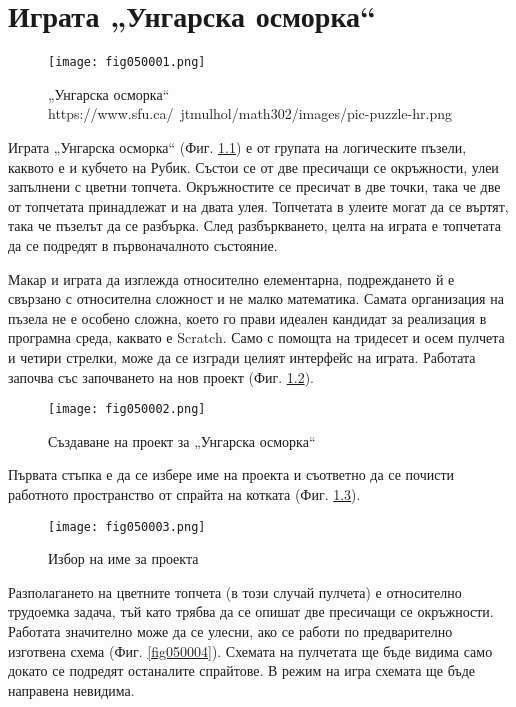 ﻿\chapter{Играта „Унгарска осморка“}

\begin{figure}[H]
  \centering
  \texttt{[image: fig050001.png]}
  \caption{„Унгарска осморка“ \\ https://www.sfu.ca/~jtmulhol/math302/images/pic-puzzle-hr.png}
\label{fig050001}
\end{figure}

Играта „Унгарска осморка“ (Фиг. \ref{fig050001}) е от групата на логическите пъзели, каквото е и кубчето на Рубик. Състои се от две пресичащи се окръжности, улеи запълнени с цветни топчета. Окръжностите се пресичат в две точки, така че две от топчетата принадлежат и на двата улея. Топчетата в улеите могат да се въртят, така че пъзелът да се разбърка. След разбъркването, целта на играта е топчетата да се подредят в първоначалното състояние. 

Макар и играта да изглежда относително елементарна, подреждането й е свързано с относителна сложност и не малко математика. Самата организация на пъзела не е особено сложна, което го прави идеален кандидат за реализация в програмна среда, каквато е Scratch. Само с помощта на тридесет и осем пулчета и четири стрелки, може да се изгради целият интерфейс на играта. Работата започва със започването на нов проект (Фиг. \ref{fig050002}).

\begin{figure}[H]
  \centering
  \texttt{[image: fig050002.png]}
  \caption{Създаване на проект за „Унгарска осморка“}
\label{fig050002}
\end{figure}

Първата стъпка е да се избере име на проекта и съответно да се почисти работното пространство от спрайта на котката (Фиг. \ref{fig050003}). 

\begin{figure}[H]
  \centering
  \texttt{[image: fig050003.png]}
  \caption{Избор на име за проекта}
\label{fig050003}
\end{figure}

Разполагането на цветните топчета (в този случай пулчета) е относително трудоемка задача, тъй като трябва да се опишат две пресичащи се окръжности. Работата значително може да се улесни, ако се работи по предварително изготвена схема (Фиг. \ref{fig050004}). Схемата на пулчетата ще бъде видима само докато се подредят останалите спрайтове. В режим на игра схемата ще бъде направена невидима.

